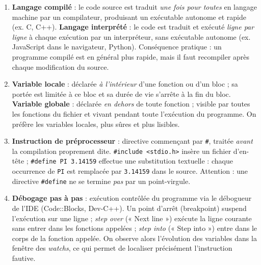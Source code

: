 \documentclass[11pt]{article}
\newcommand{\cle}[1]{{\popxbold\color{popdark}#1}}
\begin{document}
\begin{corrige}
\begin{enumerate}
    \item \textbf{Langage compilé} : le code source est traduit \emph{une fois pour toutes} en langage machine par un compilateur, produisant un exécutable autonome et rapide (ex. C, C++). \textbf{Langage interprété} : le code est traduit et exécuté \emph{ligne par ligne} à chaque exécution par un interpréteur, sans exécutable autonome (ex. JavaScript dans le navigateur, Python). Conséquence pratique : un programme compilé est en général plus rapide, mais il faut recompiler après chaque modification du source.
    \item \textbf{Variable locale} : déclarée \emph{à l'intérieur} d'une fonction ou d'un bloc ; sa portée est limitée à ce bloc et sa durée de vie s'arrête à la fin du bloc. \textbf{Variable globale} : déclarée \emph{en dehors} de toute fonction ; visible par toutes les fonctions du fichier et vivant pendant toute l'exécution du programme. On préfère les variables locales, plus sûres et plus lisibles.
    \item \textbf{Instruction de préprocesseur} : directive commençant par \texttt{\#}, traitée \emph{avant} la compilation proprement dite. \texttt{\#include <stdio.h>} insère un fichier d'en-tête ; \texttt{\#define PI 3.14159} effectue une substitution textuelle : chaque occurrence de \texttt{PI} est remplacée par \texttt{3.14159} dans le source. Attention : une directive \texttt{\#define} ne se termine \emph{pas} par un point-virgule.
    \item \textbf{Débogage pas à pas} : exécution contrôlée du programme via le débogueur de l'IDE (Code::Blocks, Dev-C++). Un \cle{point d'arrêt} (breakpoint) suspend l'exécution sur une ligne ; \emph{step over} (« Next line ») exécute la ligne courante sans entrer dans les fonctions appelées ; \emph{step into} (« Step into ») entre dans le corps de la fonction appelée. On observe alors l'évolution des variables dans la fenêtre des \emph{watchs}, ce qui permet de localiser précisément l'instruction fautive.
\end{enumerate}
\end{corrige}
\end{document}
